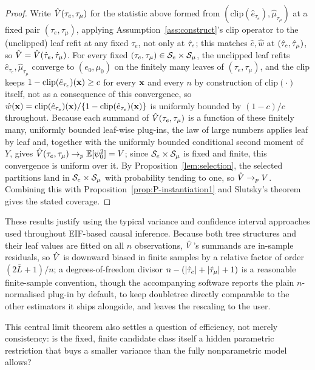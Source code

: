\documentclass[12pt]{article}
\begin{document}
\begin{proof}
Write $\hat{V}(\tau_e,\tau_\mu)$ for the statistic above formed from
$(\mathrm{clip}(\hat e_{\tau_e}),\hat\mu_{\tau_\mu})$ at a fixed pair
$(\tau_e,\tau_\mu)$, applying Assumption~\ref{ass:construct}'s clip operator
to the (unclipped) leaf refit at any fixed $\tau_e$, not only at $\hat{\tau}_e$;
this matches $\hat e,\hat w$ at $(\hat{\tau}_e,\hat{\tau}_\mu)$, so
$\hat{V}=\hat{V}(\hat{\tau}_e,\hat{\tau}_\mu)$. For every fixed
$(\tau_e,\tau_\mu)\in\mathcal{S}_e\times\mathcal{S}_\mu$, the unclipped leaf refits
$\hat e_{\tau_e},\hat\mu_{\tau_\mu}$ converge to $(e_0,\mu_0)$ on the finitely
many leaves of $(\tau_e,\tau_\mu)$, and the clip keeps
$1-\mathrm{clip}(\hat e_{\tau_e})(\mathbf{x})\ge c$ for every $\mathbf{x}$ and every $n$ by
construction of $\mathrm{clip}(\cdot)$ itself, not as a consequence of this
convergence, so $\hat w(\mathbf{x})=\mathrm{clip}(\hat e_{\tau_e})(\mathbf{x})/\{1-\mathrm{clip}(\hat e_{\tau_e})(\mathbf{x})\}$
is uniformly bounded by $(1-c)/c$ throughout.
Because each summand of $\hat{V}(\tau_e,\tau_\mu)$ is a function of these
finitely many, uniformly bounded leaf-wise plug-ins, the law of large
numbers applies leaf by leaf and, together with the uniformly bounded
conditional second moment of $Y$, gives
$\hat{V}(\tau_e,\tau_\mu)\to_p\mathbb{E}[\psi_0^2]=V$; since $\mathcal{S}_e\times\mathcal{S}_\mu$ is
fixed and finite, this convergence is uniform over it. By
Proposition~\ref{lem:selection}, the selected partitions land in
$\mathcal{S}_e\times\mathcal{S}_\mu$ with probability tending to one, so $\hat{V}\to_pV$.
Combining this with Proposition~\ref{prop:P-instantiation1} and Slutsky's
theorem gives the stated coverage.
\end{proof}
These results justify using the typical variance and confidence interval
approaches used throughout EIF-based causal inference. Because both tree
structures and their leaf values are fitted on all $n$ observations,
$\hat{V}$'s summands are in-sample residuals, so $\hat{V}$ is downward biased in
finite samples by a relative factor of order $(2\bar L+1)/n$; a
degrees-of-freedom divisor $n-(\left|\hat{\tau}_e\right|+\left|\hat{\tau}_\mu\right|+1)$ is a
reasonable finite-sample convention, though the accompanying software
reports the plain $n$-normalised plug-in by default, to keep doubletree
directly comparable to the other estimators it ships alongside, and leaves
the rescaling to the user.

This central limit theorem also settles a question of efficiency, not merely consistency: is the fixed, finite candidate class itself a hidden parametric restriction that buys a smaller variance than the fully nonparametric model allows?
\end{document}

